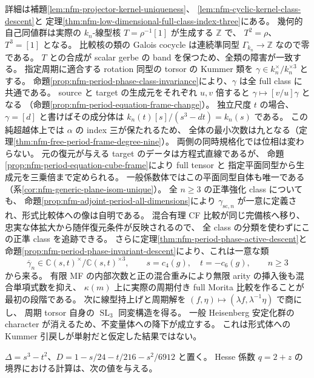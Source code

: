 \documentclass[11pt,a4paper]{ltjsarticle}
\numberwithin{equation}{section}
\newcommand{\C}{\mathbb C}
\begin{document}
詳細は補題\ref{lem:nfm-projector-kernel-uniqueness}、
\ref{lem:nfm-cyclic-kernel-class-descent}と
定理\ref{thm:nfm-low-dimensional-full-class-index-three}にある。
幾何的自己同値群は実際の $k_n$-線型核 $T=\rho^{-1}[1]$ が生成する $\mathbb Z$ で、
$T^2=\rho$、$T^3=[1]$ となる。
比較核の類の Galois cocycle は連続準同型 $\Gamma_{k_n}\to\mathbb Z$ なので零である。
$T$ との合成が scalar gerbe の band を保つため、全類の障害が一致する。
指定周期に適合する rotation 同型の torsor の Kummer 類を
$\gamma\in k_n^\times/k_n^{\times3}$ とする。
命題\ref{prop:nfm-period-phase-class-invariance}により、$\gamma$ は全 full class に共通である。
source と target の生成元をそれぞれ $u,v$ 倍すると
$\gamma\mapsto[v/u]\gamma$ となる
（命題\ref{prop:nfm-period-equation-frame-change}）。
独立尺度 $t$ の場合、$\gamma=[d]$ と書けばその成分体は
$k_n(t)[s]/(s^3-dt)=k_n(s)$ である。
この純超越体上では $\alpha$ の index 三が保たれるため、
全体の最小次数は九となる（定理\ref{thm:nfm-free-period-frame-degree-nine}）。
両側の同時規格化では位相は変わらない。
元の復元が与える target のデータは方程式直線であるが、
命題\ref{prop:nfm-period-equation-cube-frame}により full tensor と
指定平面同型から生成元を三乗倍まで定められる。
一般係数体ではこの平面同型自体も唯一である
（系\ref{cor:nfm-generic-plane-isom-unique}）。
全 $n\ge3$ の正準強化 class についても、
命題\ref{prop:nfm-adjoint-period-all-dimensions}により
$\gamma_{\mathrm{sc},n}$ が一意に定義され、形式比較体への像は自明である。
混合有理 CF 比較が同じ完備核へ移り、忠実な体拡大から随伴復元条件が反映されるので、
全 class の分類を使わずにこの正準 class を追跡できる。
さらに定理\ref{thm:nfm-period-phase-active-descent}と
命題\ref{prop:nfm-period-phase-invariant-descent}により、これは一意な類
\[
 \overline\gamma_n\in\C(s,t)^\times/\C(s,t)^{\times3},
 \qquad s=c_4(g),\quad t=-c_6(g),\qquad n\ge3
\]
から来る。
有限 MF の内部次数と正の混合重みにより無限 arity の挿入後も混合単項式数を抑え、
$\kappa(m)$ 上に実際の周期付き full Morita 比較を作ることが最初の段階である。
次に線型持上げと周期解を $(f,\eta)\mapsto(\lambda f,\lambda^{-1}\eta)$ で商にし、
周期 torsor 自身の $\operatorname{SL}_3$ 同変構造を得る。
一般 Heisenberg 安定化群の character が消えるため、不変量体への降下が成立する。
これは形式体への Kummer 引戻しが単射だと仮定した結果ではない。

$\Delta=s^3-t^2$、$D=1-s/24-t/216-s^2/6912$ と置く。
Hesse 係数 $q=2+z$ の境界における計算は、次の値を与える。
\end{document}
